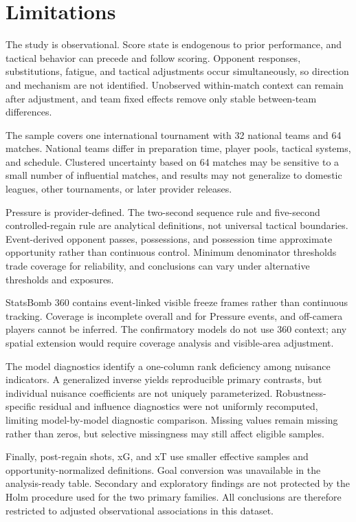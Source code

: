 \section{Limitations}

The study is observational. Score state is endogenous to prior performance, and tactical behavior can precede and follow scoring. Opponent responses, substitutions, fatigue, and tactical adjustments occur simultaneously, so direction and mechanism are not identified. Unobserved within-match context can remain after adjustment, and team fixed effects remove only stable between-team differences.

The sample covers one international tournament with 32 national teams and 64 matches. National teams differ in preparation time, player pools, tactical systems, and schedule. Clustered uncertainty based on 64 matches may be sensitive to a small number of influential matches, and results may not generalize to domestic leagues, other tournaments, or later provider releases.

Pressure is provider-defined. The two-second sequence rule and five-second controlled-regain rule are analytical definitions, not universal tactical boundaries. Event-derived opponent passes, possessions, and possession time approximate opportunity rather than continuous control. Minimum denominator thresholds trade coverage for reliability, and conclusions can vary under alternative thresholds and exposures.

StatsBomb 360 contains event-linked visible freeze frames rather than continuous tracking. Coverage is incomplete overall and for Pressure events, and off-camera players cannot be inferred. The confirmatory models do not use 360 context; any spatial extension would require coverage analysis and visible-area adjustment.

The model diagnostics identify a one-column rank deficiency among nuisance indicators. A generalized inverse yields reproducible primary contrasts, but individual nuisance coefficients are not uniquely parameterized. Robustness-specific residual and influence diagnostics were not uniformly recomputed, limiting model-by-model diagnostic comparison. Missing values remain missing rather than zeros, but selective missingness may still affect eligible samples.

Finally, post-regain shots, xG, and xT use smaller effective samples and opportunity-normalized definitions. Goal conversion was unavailable in the analysis-ready table. Secondary and exploratory findings are not protected by the Holm procedure used for the two primary families. All conclusions are therefore restricted to adjusted observational associations in this dataset.
